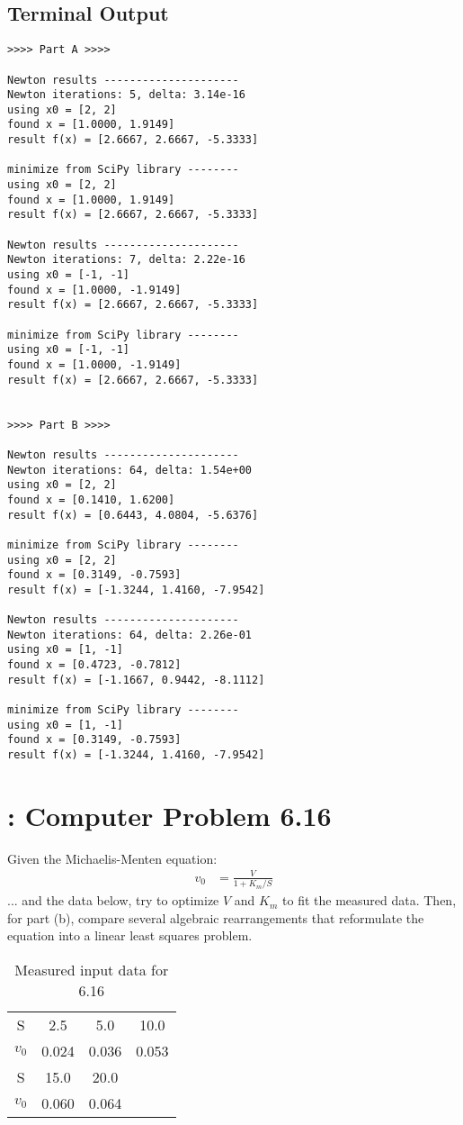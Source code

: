 \documentclass[paper=a4, fontsize=11pt]{scrartcl}
\numberwithin{equation}{section}		%
\numberwithin{figure}{section}			%
\numberwithin{table}{section}				%
\begin{document}
\vspace{4mm}
\subsection{Terminal Output}
\begin{verbatim}
>>>> Part A >>>>

Newton results ---------------------
Newton iterations: 5, delta: 3.14e-16
using x0 = [2, 2]
found x = [1.0000, 1.9149]
result f(x) = [2.6667, 2.6667, -5.3333]

minimize from SciPy library --------
using x0 = [2, 2]
found x = [1.0000, 1.9149]
result f(x) = [2.6667, 2.6667, -5.3333]

Newton results ---------------------
Newton iterations: 7, delta: 2.22e-16
using x0 = [-1, -1]
found x = [1.0000, -1.9149]
result f(x) = [2.6667, 2.6667, -5.3333]

minimize from SciPy library --------
using x0 = [-1, -1]
found x = [1.0000, -1.9149]
result f(x) = [2.6667, 2.6667, -5.3333]


>>>> Part B >>>>

Newton results ---------------------
Newton iterations: 64, delta: 1.54e+00
using x0 = [2, 2]
found x = [0.1410, 1.6200]
result f(x) = [0.6443, 4.0804, -5.6376]

minimize from SciPy library --------
using x0 = [2, 2]
found x = [0.3149, -0.7593]
result f(x) = [-1.3244, 1.4160, -7.9542]

Newton results ---------------------
Newton iterations: 64, delta: 2.26e-01
using x0 = [1, -1]
found x = [0.4723, -0.7812]
result f(x) = [-1.1667, 0.9442, -8.1112]

minimize from SciPy library --------
using x0 = [1, -1]
found x = [0.3149, -0.7593]
result f(x) = [-1.3244, 1.4160, -7.9542]
\end{verbatim}


\vspace{4mm}
\section{: Computer Problem 6.16}
Given the Michaelis-Menten equation:
\begin{align*}
	v_0 &= \frac{V}{1 + K_m/S}
\end{align*}
... and the data below, try to optimize $V$ and $K_m$ to fit the measured data. Then, for part (b), compare several algebraic rearrangements that reformulate the equation into a linear least squares problem.
\begin{table}[!hbt]
	\begin{center}
		\caption{Measured input data for 6.16}
		\label{tab:6.16input}
		\begin{tabular}{ c|c c c }
			S & 2.5 & 5.0 & 10.0\\
			$v_0$ & 0.024 & 0.036 & 0.053 \\
			\hline
			S & 15.0 & 20.0 & \\
			$v_0$ & 0.060 & 0.064 & \\
		\end{tabular}
	\end{center}
\end{table}
\end{document}
